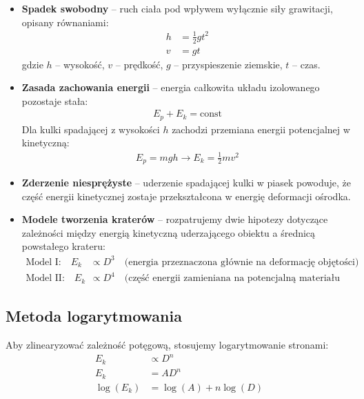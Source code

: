 \documentclass[a4paper,12pt]{article}
\begin{document}
\begin{itemize}
    \item \textbf{Spadek swobodny} -- ruch ciała pod wpływem wyłącznie siły grawitacji, opisany równaniami:
          \begin{align*}
              h & = \frac{1}{2}gt^2 \\
              v & = gt
          \end{align*}
          gdzie $h$ -- wysokość, $v$ -- prędkość, $g$ -- przyspieszenie ziemskie, $t$ -- czas.

    \item \textbf{Zasada zachowania energii} -- energia całkowita układu izolowanego pozostaje stała:
          \begin{align*}
              E_p + E_k = \text{const}
          \end{align*}
          Dla kulki spadającej z wysokości $h$ zachodzi przemiana energii potencjalnej w kinetyczną:
          \begin{align*}
              E_p = mgh \rightarrow E_k = \frac{1}{2}mv^2
          \end{align*}

    \item \textbf{Zderzenie niesprężyste} -- uderzenie spadającej kulki w piasek powoduje, że część energii kinetycznej zostaje przekształcona w energię deformacji ośrodka.

    \item \textbf{Modele tworzenia kraterów} -- rozpatrujemy dwie hipotezy dotyczące zależności między energią kinetyczną uderzającego obiektu a średnicą powstałego krateru:
          \begin{align*}
              \text{Model I:} \quad E_k  & \propto D^3 \quad \text{(energia przeznaczona głównie na deformację objętości)}          \\
              \text{Model II:} \quad E_k & \propto D^4 \quad \text{(część energii zamieniana na potencjalną materiału wyrzuconego)}
          \end{align*}
\end{itemize}

\subsection*{Metoda logarytmowania}

Aby zlinearyzować zależność potęgową, stosujemy logarytmowanie stronami:
\begin{align*}
    E_k       & \propto D^n          \\
    E_k       & = AD^n               \\
    \log(E_k) & = \log(A) + n\log(D)
\end{align*}
\end{document}
